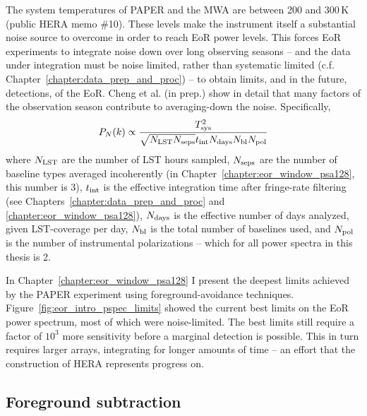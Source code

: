 The system temperatures of PAPER and the MWA are between 200 and 300\,K (public HERA memo \#10). These levels make the instrument itself a substantial noise source to overcome in order to reach EoR power levels. This forces EoR experiments to integrate noise down over long observing seasons -- and the data under integration must be noise limited, rather than systematic limited (c.f. Chapter~\ref{chapter:data_prep_and_proc}) -- to obtain limits, and in the future, detections, of the EoR. {\color{red} Cheng et al. (in prep.)} show in detail that many factors of the observation season contribute to averaging-down the noise. Specifically,
\begin{equation}
P_N(k) \propto \frac{T_{\rm sys}^2}{\sqrt{N_{\rm LST} N_{\rm seps}} t_{\rm int} N_{\rm days} N_{\rm bl} N_{\rm pol}} 
\end{equation}
where $N_{\rm LST}$ are the number of LST hours sampled, $N_{\rm seps}$ are the number of baseline types averaged incoherently (in Chapter~\ref{chapter:eor_window_psa128}, this number is 3),  $t_{\rm int}$ is the effective integration time after fringe-rate filtering (see Chapters~\ref{chapter:data_prep_and_proc} and \ref{chapter:eor_window_psa128}), $N_{\rm days}$ is the effective number of days analyzed, given LST-coverage per day, $N_{\rm bl}$ is the total number of baselines used, and $N_{\rm pol}$ is the number of instrumental polarizations -- which for all power spectra in this thesis is 2.

In Chapter~\ref{chapter:eor_window_psa128} I present the deepest limits achieved by the PAPER experiment using foreground-avoidance techniques. Figure~\ref{fig:eor_intro_pspec_limits} showed the current best limits on the EoR power spectrum, most of which were noise-limited. The best limits still require a factor of $10^3$ more sensitivity before a marginal detection is possible. This in turn requires larger arrays, integrating for longer amounts of time -- an effort that the construction of HERA represents progress on.

\subsection{Foreground subtraction}

